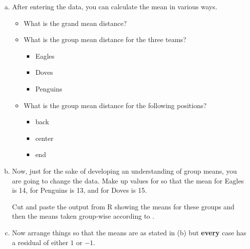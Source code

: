 \begin{enumerate}[(a)]
\item After entering the data, you can calculate the mean  in various ways.
\begin{itemize}
\item What is the grand mean distance?\\
\item What is the group mean distance for the three teams?
\begin{itemize}
\item Eagles 
\item Doves 
\item Penguins 
\end{itemize}
\item What is the group mean distance for the following positions?
\begin{itemize}
\item back 
\item center 
\item end 
\end{itemize}
\end{itemize}

\item Now, just for the sake of developing an understanding of group means, you are going to change the  data.  Make up values for  so that the mean  for Eagles is 14, for Penguins is 13, and for Doves is 15.

Cut and paste the output from R showing the means for these groups and then the means taken group-wise according to .  \TextEntry

\item Now arrange things so that the means are as stated in (b) but {\bf every} case has a residual of either $1$ or $-1$.

\end{enumerate}

